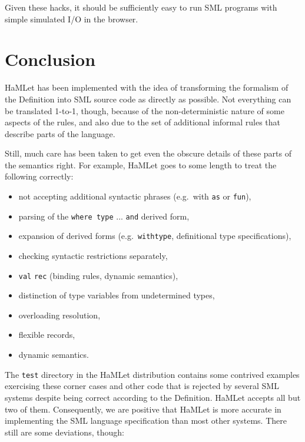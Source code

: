 \documentclass[twoside,titlepage]{article}
\begin{document}
Given these hacks, it should be sufficiently easy to run SML programs with simple simulated I/O in the browser.



\section{Conclusion}
\label{conclusion}

HaMLet has been implemented with the idea of transforming the formalism of the Definition into SML source code as directly as possible. Not everything can be translated 1-to-1, though, because of the non-deterministic nature of some aspects of the rules, and also due to the set of additional informal rules that describe parts of the language.

Still, much care has been taken to get even the obscure details of these parts of the semantics right. For example, HaMLet goes to some length to treat the following correctly:

\begin{itemize}[nolistsep]
\item not accepting additional syntactic phrases (e.g.\ with {\tt as} or {\tt fun}),
\item parsing of the {\tt where type} ... {\tt and} derived form,
\item expansion of derived forms (e.g.\ {\tt withtype}, definitional type specifications),
\item checking syntactic restrictions separately,
\item {\tt val} {\tt rec} (binding rules, dynamic semantics),
\item distinction of type variables from undetermined types,
\item overloading resolution,
\item flexible records,
\item dynamic semantics.
\end{itemize}

The {\tt test} directory in the HaMLet distribution contains some contrived examples exercising these corner cases and other code that is rejected by several SML systems despite being correct according to the Definition. HaMLet accepts all but two of them. Consequently, we are positive that HaMLet is more accurate in implementing the SML language specification than most other systems. There still are some deviations, though:
\end{document}
